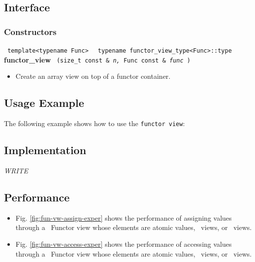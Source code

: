 \subsection{Interface} \label{sec-func-vw-inter}

\subsubsection{Constructors}

\noindent
\texttt{%
template<typename Func>
}
\texttt{%
typename functor\_view\_type<Func>::type
}
\newline
\textbf{functor\_view}%
\texttt{%
(size\_t const \&
\textit{n,}%
Func const \&
\textit{func}%
)
}

\begin{itemize}
\item
Create an array view on top of a functor container.
\end{itemize}

\subsection{Usage Example} \label{sec-fun-vw-use}

The following example shows how to use the \texttt{functor view}:


\subsection{Implementation} \label{sec-fun-vw-impl}

\textit{WRITE}

\subsection{Performance} \label{sec-fun-vw-perf}

\begin{itemize}
\item
Fig. \ref{fig:fun-vw-assign-exper}
shows the performance of assigning values through a \stapl\ Functor view
whose elements are atomic values, \stl\ views, or \stapl\ views.
\item
Fig. \ref{fig:fun-vw-access-exper}
shows the performance of accessing values through a \stapl\ Functor view
whose elements are atomic values, \stl\ views, or \stapl\ views.
\end{itemize}


